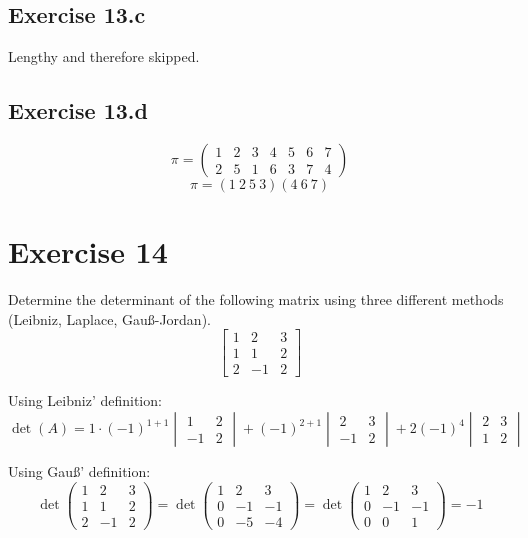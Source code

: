 \documentclass[a4paper]{article}
\theoremstyle{definition}
\begin{document}
\subsection{Exercise 13.c}

Lengthy and therefore skipped.

\subsection{Exercise 13.d}
%
\[
  \pi = \begin{pmatrix}
    1 & 2 & 3 & 4 & 5 & 6 & 7 \\
    2 & 5 & 1 & 6 & 3 & 7 & 4
  \end{pmatrix}
\] \[
  \pi = (1\ 2\ 5\ 3) (4\ 6\ 7)
\]

\section{Exercise 14}
\begin{ex}
  Determine the determinant of the following matrix using three different methods
  (Leibniz, Laplace, Gau\ss-Jordan).
  \[
    \begin{bmatrix}
      1 & 2 & 3 \\
      1 & 1 & 2 \\
      2 & -1 & 2
    \end{bmatrix}
  \]
\end{ex}

Using Leibniz' definition:
\[
  \det(A) = 1 \cdot (-1)^{1+1} \begin{vmatrix} 1 & 2 \\ -1 & 2 \end{vmatrix}
    + (-1)^{2+1} \begin{vmatrix} 2 & 3 \\ -1 & 2 \end{vmatrix}
    + 2 (-1)^4 \begin{vmatrix} 2 & 3 \\ 1 & 2 \end{vmatrix}
\]

Using Gau\ss' definition:
\[
  \det{
  \begin{pmatrix}
    1 & 2 & 3  \\
    1 & 1 & 2 \\
    2 & -1 & 2
  \end{pmatrix}
  } = \det{
  \begin{pmatrix}
    1 & 2 & 3 \\
    0 & -1 & -1 \\
    0 & -5 & -4
  \end{pmatrix}
  } = \det{
  \begin{pmatrix}
    1 & 2 & 3 \\
    0 & -1 & -1 \\
    0 & 0 & 1
  \end{pmatrix}
  } = -1
\]
\end{document}
